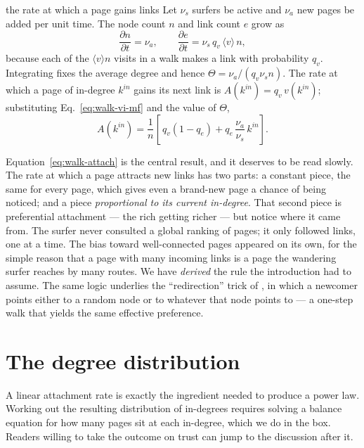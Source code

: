 \begin{calculation}{the rate at which a page gains links}
Let $\nu_s$ surfers be active and $\nu_a$ new pages be added per unit time. The
node count $n$ and link count $e$ grow as
\begin{equation}
  \frac{\partial n}{\partial t} = \nu_a, \qquad
  \frac{\partial e}{\partial t} = \nu_s\, q_v\, \langle v \rangle\, n,
  \label{eq:walk-growth}
\end{equation}
because each of the $\langle v\rangle n$ visits in a walk makes a link with
probability $q_v$. Integrating fixes the average degree and hence $\Theta =
\nu_a/(q_v\nu_s n)$. The rate at which a page of in-degree $k^{in}$ gains its
next link is $A(k^{in}) = q_v\, v(k^{in})$; substituting
Eq.~\eqref{eq:walk-vi-mf} and the value of $\Theta$,
\begin{equation}
  A(k^{in}) = \frac{1}{n}\left[\, q_v(1-q_e) + q_e\, \frac{\nu_a}{\nu_s}\, k^{in} \right].
  \label{eq:walk-attach}
\end{equation}
\end{calculation}

Equation~\eqref{eq:walk-attach} is the central result, and it deserves to be
read slowly. The rate at which a page attracts new links has two parts: a
constant piece, the same for every page, which gives even a brand-new page a
chance of being noticed; and a piece \emph{proportional to its current
in-degree}. That second piece is preferential attachment --- the rich getting
richer --- but notice where it came from. The surfer never consulted a global
ranking of pages; it only followed links, one at a time. The bias toward
well-connected pages appeared on its own, for the simple reason that a page with
many incoming links is a page the wandering surfer reaches by many routes. We
have \emph{derived} the rule the introduction had to assume. The same logic
underlies the ``redirection'' trick of \citet{krapivsky2001}, in which a newcomer
points either to a random node or to whatever that node points to --- a one-step
walk that yields the same effective preference.

\section{The degree distribution}

A linear attachment rate is exactly the ingredient needed to produce a power
law. Working out the resulting distribution of in-degrees requires solving a
balance equation for how many pages sit at each in-degree, which we do in the
box. Readers willing to take the outcome on trust can jump to the discussion
after it.

